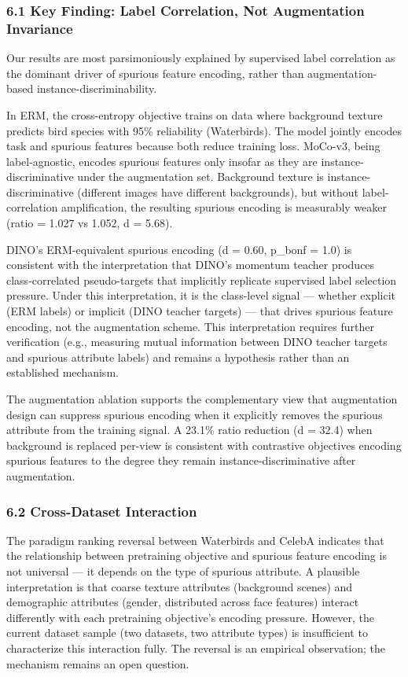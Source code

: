 
\subsubsection{6.1 Key Finding: Label Correlation, Not Augmentation Invariance}

Our results are most parsimoniously explained by supervised label correlation as the dominant driver of spurious feature encoding, rather than augmentation-based instance-discriminability.

In ERM, the cross-entropy objective trains on data where background texture predicts bird species with 95\% reliability (Waterbirds). The model jointly encodes task and spurious features because both reduce training loss. MoCo-v3, being label-agnostic, encodes spurious features only insofar as they are instance-discriminative under the augmentation set. Background texture is instance-discriminative (different images have different backgrounds), but without label-correlation amplification, the resulting spurious encoding is measurably weaker (ratio = 1.027 vs 1.052, d = 5.68).

DINO's ERM-equivalent spurious encoding (d = 0.60, p\_bonf = 1.0) is consistent with the interpretation that DINO's momentum teacher produces class-correlated pseudo-targets that implicitly replicate supervised label selection pressure. Under this interpretation, it is the class-level signal --- whether explicit (ERM labels) or implicit (DINO teacher targets) --- that drives spurious feature encoding, not the augmentation scheme. This interpretation requires further verification (e.g., measuring mutual information between DINO teacher targets and spurious attribute labels) and remains a hypothesis rather than an established mechanism.

The augmentation ablation supports the complementary view that augmentation design can suppress spurious encoding when it explicitly removes the spurious attribute from the training signal. A 23.1\% ratio reduction (d = 32.4) when background is replaced per-view is consistent with contrastive objectives encoding spurious features to the degree they remain instance-discriminative after augmentation.

\subsubsection{6.2 Cross-Dataset Interaction}

The paradigm ranking reversal between Waterbirds and CelebA indicates that the relationship between pretraining objective and spurious feature encoding is not universal --- it depends on the type of spurious attribute. A plausible interpretation is that coarse texture attributes (background scenes) and demographic attributes (gender, distributed across face features) interact differently with each pretraining objective's encoding pressure. However, the current dataset sample (two datasets, two attribute types) is insufficient to characterize this interaction fully. The reversal is an empirical observation; the mechanism remains an open question.

